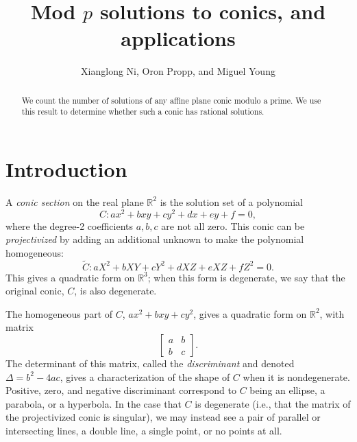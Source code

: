 \documentclass[10pt,a4paper]{amsart}
\numberwithin{equation}{section}
\numberwithin{figure}{section}
\theoremstyle{definition}
\theoremstyle{plain}
\theoremstyle{remark}
\theoremstyle{plain}
\theoremstyle{definition}
\theoremstyle{plain}
\theoremstyle{plain}
\newcommand{\R}{\mathbb{R}}
\begin{document}
 

\title{Mod $p$ solutions to conics, and applications} 
\author{Xianglong Ni, Oron Propp, and Miguel Young}
\maketitle

\begin{abstract} 
	We count the number of solutions of any affine plane conic modulo a prime.
	We use this result to determine whether such a conic has rational solutions. 
\end{abstract}

\tableofcontents

\section{Introduction}\label{sec:intro} 

	A \emph{conic section} on the real plane $\R^2$ is the solution set of 
	a polynomial
	\[ C: ax^2 + bxy + cy^2 + dx + ey + f = 0, \]
	where the degree-2 coefficients $a, b, c$ are not all zero. This conic can be \emph{projectivized} by adding an additional
	unknown to make the polynomial homogeneous:
	\[ \widetilde{C}: aX^2 + bXY + cY^2 + dXZ + eXZ + fZ^2 = 0. \]
	This gives a quadratic form on $\R^3$; when this form is degenerate, we
	say that the original conic, $C$, is also degenerate.
	
	The homogeneous part of $C$, $ax^2 + bxy + cy^2$, gives a quadratic form
	on $\R^2$, with matrix
	\[ \begin{bmatrix}
	a & b \\
	b & c
	\end{bmatrix}. \]
	The determinant of this matrix, called the \emph{discriminant} and
	denoted $\Delta = b^2 - 4ac$, gives a characterization of the shape of $C$
	when it is nondegenerate. Positive, zero, and negative discriminant
	correspond to $C$ being an ellipse, a parabola, or a hyperbola. In the
	case that $C$ is degenerate (i.e., that the matrix of the projectivized
	conic is singular), we may instead see a pair of parallel or intersecting 
	lines, a double line, a single point, or no points at all.
	
\end{document}
